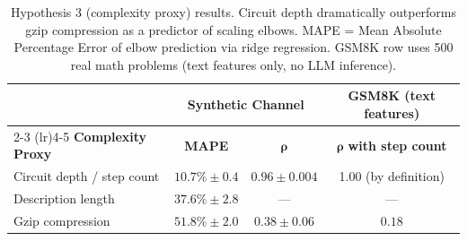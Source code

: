 \begin{table}[t]
\centering
\caption{Hypothesis 3 (complexity proxy) results. Circuit depth dramatically outperforms gzip compression as a predictor of scaling elbows. MAPE = Mean Absolute Percentage Error of elbow prediction via ridge regression. GSM8K row uses 500 real math problems (text features only, no LLM inference).}
\label{tab:h3}
\small
\begin{tabular}{lcccc}
\toprule
& \multicolumn{2}{c}{\textbf{Synthetic Channel}} & \multicolumn{2}{c}{\textbf{GSM8K (text features)}} \\
\cmidrule(lr){2-3} \cmidrule(lr){4-5}
\textbf{Complexity Proxy} & \textbf{MAPE} & $\bm{\rho}$ & \multicolumn{2}{c}{$\bm{\rho}$ \textbf{with step count}} \\
\midrule
Circuit depth / step count & $\bm{10.7\%} \pm 0.4$ & $\bm{0.96} \pm 0.004$ & \multicolumn{2}{c}{1.00 (by definition)} \\
Description length & $37.6\% \pm 2.8$ & --- & \multicolumn{2}{c}{---} \\
Gzip compression & $51.8\% \pm 2.0$ & $0.38 \pm 0.06$ & \multicolumn{2}{c}{$0.18$} \\
\bottomrule
\end{tabular}
\end{table}

